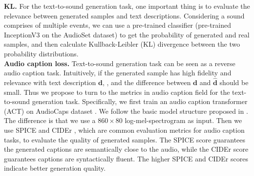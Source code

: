 \documentclass[lettersize,journal]{IEEEtran}
\begin{document}
\textbf{KL.} For the text-to-sound generation task, one important thing is to evaluate the relevance between generated samples and text descriptions. Considering a sound comprises of multiple events, we can use a pre-trained classifier (pre-trained InceptionV3 on the AudioSet dataset) to get the probability of generated and real samples, and then calculate Kullback-Leibler (KL) divergence between the two probability distributions.  \\
\textbf{Audio caption loss.} Text-to-sound generation task can be seen as a reverse audio caption \cite{wu2019audio,drossos2020clotho} task. Intuitively, if the generated sample has high fidelity and relevance with text description $\boldsymbol{d}$, {}, and the difference between $\boldsymbol{d}$ and $\boldsymbol{\hat{d}}$ should be small. Thus we propose to turn to the metrics in audio caption field for the text-to-sound generation task. Specifically, we first train an audio caption transformer (ACT) \cite{mei2021audio} on AudioCaps dataset \cite{kim2019audiocaps}. We follow the basic model structure proposed in \cite{mei2021audio}. The difference is that we use a $860 \times 80$ log-mel-spectrogram as input. Then we use SPICE \cite{anderson2016spice} and CIDEr \cite{vedantam2015cider}, which are common evaluation metrics for audio caption tasks, to evaluate the quality of generated samples. The SPICE score guarantees the generated captions are semantically {\color{black}close} to the audio, while the CIDEr score guarantees captions are syntactically fluent. The higher SPICE and CIDEr scores indicate better generation quality.
\end{document}
